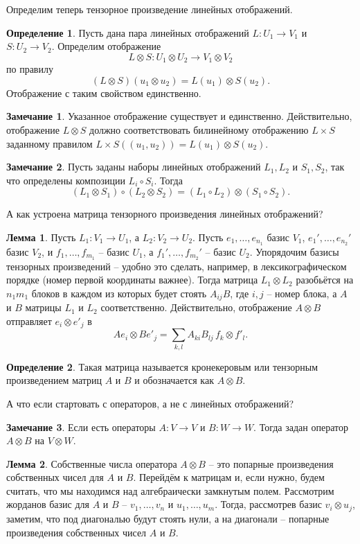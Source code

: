 \documentclass[10pt,a4paper,oneside]{book}
\theoremstyle{definition}
\newtheorem*{rem}{\color{green!50!blue}Замечание}
\newtheorem*{defn}{\color{yellow!30!red} Определение}
\newtheorem{lem}{\color{green!50!black}Лемма}
\def\dfn{\begin{defn}}
\def\edfn{\end{defn}}
\def\lm{\begin{lem}}
\def\elm{\end{lem}}
\def\rm{\begin{rem}}
\def\erm{\end{rem}}
\begin{document}
Определим теперь тензорное произведение линейных отображений.

\dfn Пусть дана пара линейных отображений $L \colon U_1 \to V_1$ и $S\colon U_2 \to V_2 $. Определим отображение $$L\otimes S \colon U_1\otimes U_2 \to V_1\otimes V_2$$ по  правилу $$(L \otimes S) (u_1\otimes  u_2) = L(u_1)\otimes S(u_2).$$
Отображение с таким свойством единственно.
\edfn

\rm Указанное отображение существует и единственно. Действительно,  отображение $L\otimes S$ должно соответствовать билинейному отображению $L\times S$ заданному правилом $L\times S ((u_1,u_2)) = L(u_1)\otimes S(u_2)$. 
\erm

\rm Пусть заданы наборы линейных отображений $L_1, L_2$ и $S_1, S_2$, так что определены композиции $L_i\circ S_i$. Тогда
$$(L_1\otimes S_1) \circ (L_2 \otimes S_2)=(L_1\circ L_2)\otimes (S_1\circ S_2).$$
\erm 

А как устроена матрица тензорного произведения линейных отображений?


\lm Пусть $L_1 \colon V_1 \to U_1$, а $L_2 \colon V_2 \to U_2$. Пусть $e_1,\dots, e_{n_1}$ базис $V_1$,  $e_1',\dots, e_{n_2}'$ базис $V_2$,  и $f_1,\dots, f_{m_1}$ -- базис $U_1$, а $f_1',\dots, f_{m_2}'$ -- базис $U_2$. 
Упорядочим базисы тензорных произведений -- удобно это сделать, например, в лексикографическом порядке (номер первой координаты важнее).
Тогда матрица  $L_1\otimes L_2$  разобьётся на $n_1m_1$ блоков в каждом из которых будет стоять $ A_{ij} B$, где $i,j$ -- номер блока, а $A$ и $B$ матрицы $L_1$ и $L_2$ соответственно.
\proof Действительно, отображение $A\otimes B$ отправляет $e_i\otimes e'_j$ в 
$$Ae_i \otimes Be'_j = \sum_{k,l} A_{ki}B_{lj} \, f_k\otimes f'_l.$$
\endproof
\elm

\dfn Такая матрица называется кронекеровым или тензорным произведением матриц $A$ и $B$ и обозначается как $A\otimes B$.
\edfn

А что если стартовать с операторов, а не с линейных отображений?

\rm Если есть операторы $A\colon V \to V$ и $B \colon W \to W$. Тогда задан оператор $A\otimes B$ на $V\otimes W$.
\erm

\lm Собственные числа оператора $A\otimes B$  -- это попарные произведения собственных чисел для $A$ и $B$. 
\proof Перейдём к матрицам и, если нужно, будем считать, что мы находимся над алгебраически замкнутым полем. Рассмотрим жорданов базис для $A$ и $B$ -- $v_1,\dots,v_n$ и $u_1,\dots, u_m$. Тогда, рассмотрев базис $v_i\otimes u_j$, заметим, что под диагональю будут стоять нули, а на диагонали -- попарные произведения собственных чисел $A$ и $B$.
\endproof
\elm
\end{document}
